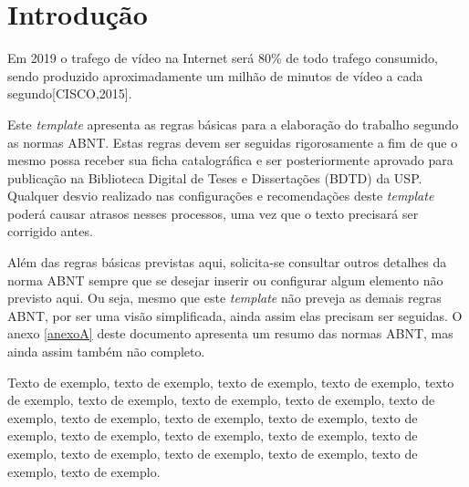 \documentclass[
	12pt,				%
	oneside,			%
	a4paper,			%
	english,			%
	brazil				%
	]{abntex2ppgsi}
\begin{document}
\tableofcontents*
\cleardoublepage



\textual



% 
%
%
\chapter{Introdução}

Em 2019 o trafego de vídeo na Internet será 80\% de todo trafego consumido, sendo produzido aproximadamente um milhão de minutos de vídeo a cada segundo[CISCO,2015].

Este \textit{template} apresenta as regras básicas para a elaboração do trabalho segundo as normas ABNT. Estas regras devem ser seguidas rigorosamente a fim de que o mesmo possa receber sua ficha catalográfica e ser posteriormente aprovado para publicação na Biblioteca Digital de Teses e Dissertações (BDTD) da USP. Qualquer desvio realizado nas configurações e recomendações deste \textit{template} poderá causar atrasos nesses processos, uma vez que o texto precisará ser corrigido antes. 

Além das regras básicas previstas aqui, solicita-se consultar outros detalhes da norma ABNT sempre que se desejar inserir ou configurar algum elemento não previsto aqui. Ou seja, mesmo que este \textit{template} não preveja as demais regras ABNT, por ser uma visão simplificada, ainda assim elas precisam ser seguidas. O anexo \ref{anexoA} deste documento apresenta um resumo das normas ABNT, mas ainda assim também não completo.

Texto de exemplo, texto de exemplo, texto de exemplo, texto de exemplo, texto de exemplo, texto de exemplo, texto de exemplo, texto de exemplo, texto de exemplo, texto de exemplo, texto de exemplo, texto de exemplo, texto de exemplo, texto de exemplo, texto de exemplo, texto de exemplo, texto de exemplo, texto de exemplo, texto de exemplo, texto de exemplo, texto de exemplo, texto de exemplo.  
\end{document}
